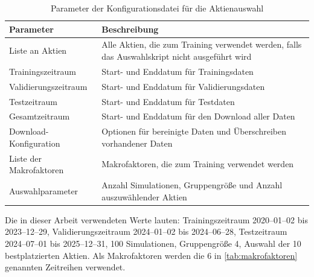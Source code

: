 \begin{table}[h!]
    \centering
    \small
    \begin{tabular}{p{5cm}p{9cm}}
        \toprule
        \textbf{Parameter}      & \textbf{Beschreibung}                                                                         \\
        \midrule
        Liste an Aktien         & Alle Aktien, die zum Training verwendet werden, falls das Auswahlskript nicht ausgeführt wird \\
        \addlinespace
        Trainingszeitraum       & Start- und Enddatum für Trainingsdaten                                                        \\
        \addlinespace
        Validierungszeitraum    & Start- und Enddatum für Validierungsdaten                                                     \\
        \addlinespace
        Testzeitraum            & Start- und Enddatum für Testdaten                                                             \\
        \addlinespace
        Gesamtzeitraum          & Start- und Enddatum für den Download aller Daten                                              \\
        \addlinespace
        Download-Konfiguration  & Optionen für bereinigte Daten und Überschreiben vorhandener Daten                             \\
        \addlinespace
        Liste der Makrofaktoren & Makrofaktoren, die zum Training verwendet werden                                              \\
        \addlinespace
        Auswahlparameter        & Anzahl Simulationen, Gruppengröße und Anzahl auszuwählender Aktien                            \\
        \bottomrule
    \end{tabular}
    \caption{Parameter der Konfigurationsdatei für die Aktienauswahl}\label{tab:config_params}
\end{table}

\vspace{0.5em}
\noindent Die in dieser Arbeit verwendeten Werte lauten: Trainingszeitraum 2020--01--02 bis 2023--12--29, Validierungszeitraum 2024--01--02 bis 2024--06--28, Testzeitraum 2024--07--01 bis 2025--12--31, 100 Simulationen, Gruppengröße 4, Auswahl der 10 bestplatzierten Aktien. Als Makrofaktoren werden die 6 in \cref{tab:makrofaktoren} genannten Zeitreihen verwendet.

